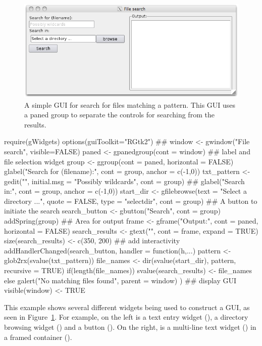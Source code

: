 \begin{figure}
  \centering
  \includegraphics[width=.8\textwidth]{fig-file-search.png}
  \caption{A simple GUI for search for files matching a pattern. This
    GUI uses a paned group to separate the controls for searching from
    the results.}
  \label{fig:file-search}
\end{figure}

\begin{Schunk}
\begin{Sinput}
 require(gWidgets)
 options(guiToolkit="RGtk2")
 ## 
 window <- gwindow("File search", visible=FALSE)
 paned <- gpanedgroup(cont = window)
 ## label and file selection widget
 group <- ggroup(cont = paned, horizontal = FALSE)
 glabel("Search for (filename):", cont = group, anchor = c(-1,0))
 txt_pattern <- gedit("", initial.msg = "Possibly wildcards", 
                     cont = group)
 ##
 glabel("Search in:", cont = group, anchor = c(-1,0))
 start_dir <- gfilebrowse(text = "Select a directory ...",
                         quote = FALSE,
                         type = "selectdir", cont = group)
 ## A button to initiate the search
 search_button <- gbutton("Search", cont = group)
 addSpring(group)
 ## Area for output
 frame <- gframe("Output:", cont = paned, horizontal = FALSE)
 search_results <- gtext("", cont = frame, expand = TRUE)
 size(search_results) <- c(350, 200)
 ## add interactivity
 addHandlerChanged(search_button, handler = function(h,...) {
   pattern <- glob2rx(svalue(txt_pattern))
   file_names <- dir(svalue(start_dir), pattern, recursive = TRUE)
   if(length(file_names))
     svalue(search_results) <- file_names
   else
     galert("No matching files found", parent = window)
 })
 ## display GUI
 visible(window) <- TRUE
\end{Sinput}
\end{Schunk}

This example shows several different widgets being used to construct a
GUI, as seen in Figure~\ref{fig:file-search}. For example, on the
left is a text entry widget (), a directory browsing
widget () and a button (). On the
right, is a multi-line text widget () in a framed
container ().


